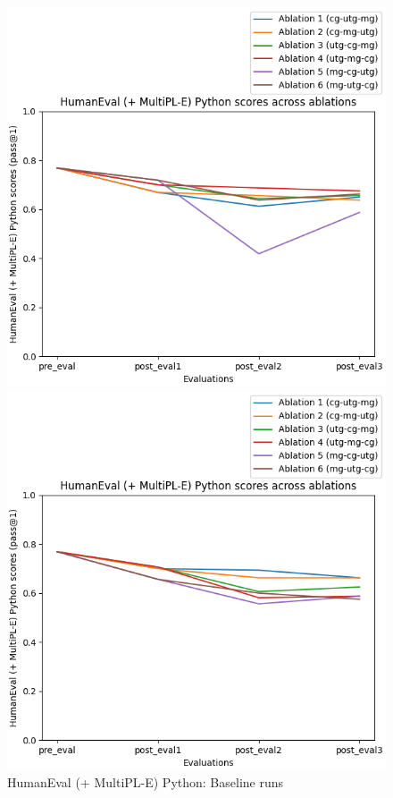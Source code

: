 \begin{figure}[H]
    \centering
    \begin{minipage}{0.45\textwidth}
        \centering
        \includegraphics[width=1.1\textwidth]{Figures/results/code_baseline_graphs/human_eval/seed_averaged_humaneval_python_eval_baseline.png} %
        \captionsetup{width=1.1\textwidth}
        \caption{HumanEval (+ MultiPL-E) Python: Baseline runs}
        \label{PythonBaselineAblations}
    \end{minipage}\hfill
    \begin{minipage}{0.45\textwidth}
        \centering
        \includegraphics[width=1.1\textwidth]{Figures/results/code_mitigation_graphs/human_eval/seed_averaged_humaneval_python_eval_mitigation.png} %

\end{minipage}
\end{figure}
